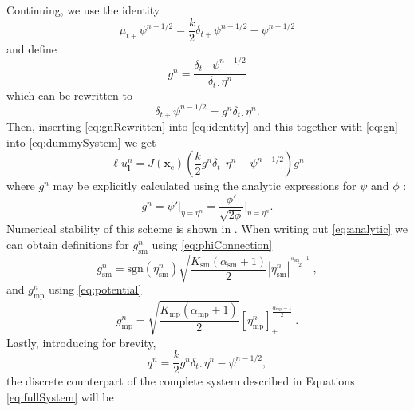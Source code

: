 \documentclass[dvipsnames, pdftex]{article}
\begin{document}
Continuing, we use the identity 
\begin{equation}\label{eq:identity}
    \mu_{t+}\psi^{n-1/2} = \frac{k}{2}\delta_{t+}\psi^{n-1/2}-\psi^{n-1/2}
\end{equation}
and define
\begin{equation}\label{eq:gn}
    g^n = \frac{\delta_{t+}\psi^{n-1/2}}{\delta_{t\cdot}\eta^n}
\end{equation}
which can be rewritten to
\begin{equation}\label{eq:gnRewritten}
    \delta_{t+}\psi^{n-1/2} = g^n\delta_{t\cdot}\eta^n.
\end{equation}
Then, inserting \eqref{eq:gnRewritten} into \eqref{eq:identity} and this together with \eqref{eq:gn} into \eqref{eq:dummySystem} we get
\begin{equation}\label{eq:inserted}
    \ell u^n_{\boldsymbol{l}} = J(\boldsymbol{x}_\text{c})\left(\frac{k}{2}g^n\delta_{t\cdot}\eta^n-\psi^{n-1/2}\right)g^n
\end{equation}
where $g^n$ may be explicitly calculated using the analytic expressions for $\psi$ and $\phi$ \cite{Ducceschi2019}:
\begin{equation}\label{eq:analytic}
    g^n = \psi'\bigg\rvert_{\eta=\eta^n} = \frac{\phi'}{\sqrt{2\phi}}\bigg\rvert_{\eta=\eta^n}.
\end{equation}
Numerical stability of this scheme is shown in \cite{Ducceschi2019}. When writing out \eqref{eq:analytic} we can obtain definitions for $g_\text{sm}^n$ using \eqref{eq:phiConnection}
\begin{equation}\label{eq:gnSM}
    g_\text{sm}^n =\text{sgn}(\eta_\text{sm}^n)\sqrt{\frac{K_\text{sm}(\alpha_\text{sm}+1)}{2}}|\eta_\text{sm}^n|^{\frac{\alpha_\text{sm}-1}{2}}\ ,
\end{equation}
and $g_\text{mp}^n$ using \eqref{eq:potential}
\begin{equation}\label{eq:gnMP}
    g_\text{mp}^n =\sqrt{\frac{K_\text{mp}(\alpha_\text{mp} + 1)}{2}} [\eta_\text{mp}^n]_+^{\frac{\alpha_\text{mp} - 1}{2}}\ .
\end{equation} 
Lastly, introducing for brevity,
\begin{equation}\label{eq:qn}
    q^n  = \frac{k}{2}g^n\delta_{t\cdot}\eta^n-\psi^{n-1/2},
\end{equation}
the discrete counterpart of the complete system described in Equations \eqref{eq:fullSystem} will be
\end{document}
